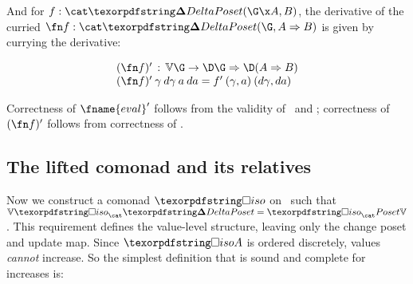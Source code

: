 \documentclass{rntz}\usepackage{fantasy}%
\newcommand\mathvar[1]{\ensuremath{{#1}}} %
\begin{document}
\noindent
And for $f : \CP(\G \x A, B)$, the derivative of the curried $\fn f : \CP(\G,
\expO A B)$ is given by currying the derivative:

\[
\begin{array}{l}
  \deriv{(\fn f)} \,:\, \vals\G \to \expO{\chgs \G}{\chgs{(\expO A B)}}\\
  \deriv{(\fn f)} \<\gamma \<\mathvar{\dgamma} \<a \<\da
  = \deriv f \<(\gamma,a) \<(\mathvar{\dgamma}, \da)
\end{array}
\]

\noindent
Correctness of $\deriv{\fname{eval}}$ follows from the validity of \df\ and \da;
correctness of $\deriv{(\fn f)}$ follows from correctness of .



%



\subsection{The lifted \iso{} comonad and its relatives}
\label{sec:CP-iso}

Now we construct a comonad $\iso$ on \CP\ such that $\valfn\iso_\CP =
\iso_\Poset\valfn$. This requirement defines the value-level structure, leaving
only the change poset and update map. Since $\isof A$ is ordered discretely,
values \emph{cannot} increase. So the simplest definition that is sound and
complete for increases is:
\end{document}
